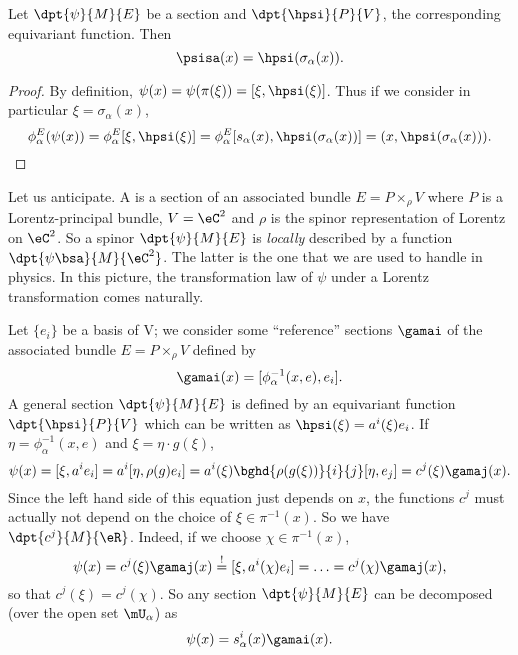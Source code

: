 	\begin{lemma}
	Let $\dpt{\psi}{M}{E}$ be a section and $\dpt{\hpsi}{P}{V}$, the corresponding equivariant function. Then
	\[
		\psisa(x)=\hpsi(\sigma_{\alpha}(x)).
		\]
		\end{lemma}

		\begin{proof}
		By definition, $\psi(x)=\psi(\pi(\xi))=[\xi,\hpsi(\xi)]$.  Thus if we consider in particular $\xi=\sigma_{\alpha}(x)$,
		\begin{equation}
		\phi^E_{\alpha}(\psi(x))=\phi^E_{\alpha}[\xi,\hpsi(\xi)]
		=\phi^E_{\alpha}[s_{\alpha}(x),\hpsi(\sigma_{\alpha}(x))]
		=(x,\hpsi(\sigma_{\alpha}(x))).
		\end{equation}

		\end{proof}

		Let us anticipate. A  is a section of an associated bundle $E=P\times_{\rho} V$ where $P$ is a Lorentz-principal bundle, $V=\eC^2$ and $\rho$ is the spinor representation of Lorentz on $\eC^2$. So a spinor $\dpt{\psi}{M}{E}$ is \emph{locally} described by a function $\dpt{\psi\bsa}{M}{\eC^2}$. The latter is the one that we are used to handle in physics. In this picture, the transformation law of $\psi$ under a Lorentz transformation comes naturally.

		Let $\{e_i\}$ be a basis of V; we consider some ``reference'' sections $\gamai$ of the associated bundle $E=P\times_{\rho} V$ defined by
		\begin{equation}\label{eq:def:gamai}
		\gamai(x)=[\phi_{\alpha}^{-1}(x,e),e_i].
		\end{equation}
		A general section $\dpt{\psi}{M}{E}$ is defined by an equivariant function $\dpt{\hpsi}{P}{V}$ which can be written as $\hpsi(\xi)=a^i(\xi)e_i$. If $\eta=\phi_{\alpha}^{-1}(x,e)$ and $\xi=\eta\cdot g(\xi)$,
		\begin{equation}
		\psi(x)=[\xi,a^ie_i]
		=a^i[\eta,\rho(g)e_i]
		=a^i(\xi)\bghd{\rho(g(\xi))}{i}{j}[\eta,e_j]
		=c^j(\xi)\gamaj(x).
		\end{equation}
		Since the left hand side of this equation just depends on $x$, the functions $c^j$ must actually not depend on the choice of $\xi\in\pi^{-1}(x)$. So we have $\dpt{c^j}{M}{\eR}$. Indeed, if we choose $\chi\in\pi^{-1}(x)$,
	\[
\psi(x)=c^j(\xi)\gamaj(x)
	\stackrel{!}{=}[\xi,a^{i}(\chi)e_i]
	=\ldots
	=c^j(\chi)\gamaj(x),
	\]
	so that $c^j(\xi)=c^j(\chi)$. So any section $\dpt{\psi}{M}{E}$ can be decomposed (over the open set $\mU_{\alpha}$) as
	\begin{equation}
	\psi(x)=s_{\alpha}^i(x)\gamai(x).
	\end{equation}


